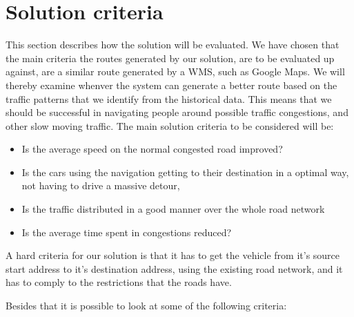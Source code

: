 \section{Solution criteria}
This section describes how the solution will be evaluated.
We have chosen that the main criteria the routes generated by our solution, are to be evaluated up against, are a similar route generated by a WMS, such as Google Maps. We will thereby examine whenver the system can generate a better route based on the traffic patterns that we identify from the historical data. This means that we should be successful in navigating people around possible traffic congestions, and other slow moving traffic.
The main solution criteria to be considered will be:

\begin{itemize}
	\item Is the average speed on the normal congested road improved?
	\item Is the cars using the navigation getting to their destination in a optimal way, not having to drive a massive detour,
	\item Is the traffic distributed in a good manner over the whole road network
	\item Is the average time spent in congestions reduced?
\end{itemize}


A hard criteria for our solution is that it has to get the vehicle from it's source start address to it's destination address, using the existing road network, and it has to comply to the restrictions that the roads have.

Besides that it is possible to look at some of the following criteria:

